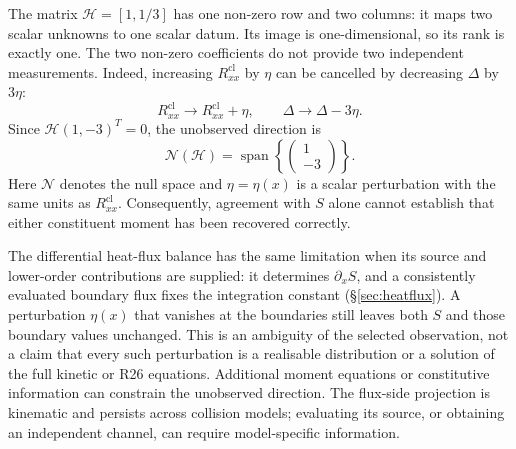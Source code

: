 \documentclass[lineno,paper]{JFM-FLM_Au}
\newenvironment{revision}{\nolinenumbers\begin{tcolorbox}[breakable,colback=revisionyellow,colframe=revisionyellow,boxrule=0pt,arc=0pt,left=5pt,right=5pt,top=5pt,bottom=5pt,before skip=6pt,after skip=6pt]\captionsetup{width=\linewidth}}{\end{tcolorbox}\linenumbers}
\newenvironment{revision}{}{}
\newcommand{\cl}{\mathrm{cl}}
\begin{document}
\begin{revision}
The matrix $\mathcal H=[1,1/3]$ has one non-zero row and two columns: it maps two scalar unknowns to one scalar datum. Its image is one-dimensional, so its rank is exactly one. The two non-zero coefficients do not provide two independent measurements. Indeed, increasing $R^{\cl}_{xx}$ by $\eta$ can be cancelled by decreasing $\Delta$ by $3\eta$:
\begin{equation}
  R^{\cl}_{xx}\rightarrow R^{\cl}_{xx}+\eta,\qquad
  \Delta\rightarrow\Delta-3\eta .
  \label{eq:null_transform}
\end{equation}
Since $\mathcal H(1,-3)^T=0$, the unobserved direction is
\begin{equation}
  \mathcal N(\mathcal H)=\operatorname{span}\left\{\begin{pmatrix}1\\ -3\end{pmatrix}\right\} .
  \label{eq:nullspace}
\end{equation}
Here $\mathcal N$ denotes the null space and $\eta=\eta(x)$ is a
scalar perturbation with the same units as $R^{\cl}_{xx}$.
Consequently, agreement with $S$ alone cannot establish that either constituent moment has been recovered correctly.

The differential heat-flux balance has the same limitation when its source and lower-order contributions are supplied: it determines $\partial_x S$, and a consistently evaluated boundary flux fixes the integration constant (\S\ref{sec:heatflux}). A perturbation $\eta(x)$ that vanishes at the boundaries still leaves both $S$ and those boundary values unchanged. This is an ambiguity of the selected observation, not a claim that every such perturbation is a realisable distribution or a solution of the full kinetic or R26 equations. Additional moment equations or constitutive information can constrain the unobserved direction. The flux-side projection is kinematic and persists across collision models; evaluating its source, or obtaining an independent channel, can require model-specific information.
\end{revision}
\end{document}
